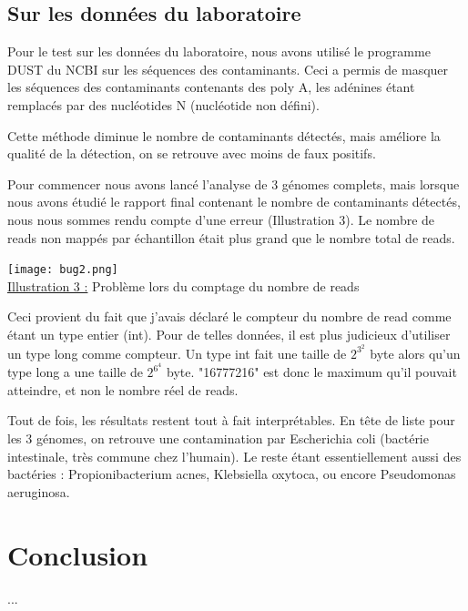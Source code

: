 \documentclass[a4paper,12pt]{article}
\begin{document}
\subsection{Sur les données du laboratoire}

Pour le test sur les données du laboratoire, nous avons utilisé le programme DUST du NCBI sur les séquences des contaminants. Ceci a permis de masquer les séquences des contaminants contenants des poly A, les adénines étant remplacés par des nucléotides N (nucléotide non défini).

Cette méthode diminue le nombre de contaminants détectés, mais améliore la qualité de la détection, on se retrouve avec moins de faux positifs. 

Pour commencer nous avons lancé l'analyse de 3 génomes complets, mais lorsque nous avons étudié le rapport final contenant le nombre de contaminants détectés, nous nous sommes rendu compte d'une erreur (Illustration 3). Le nombre de reads non mappés par échantillon était plus grand que le nombre total de reads. 
\begin{center}
 \texttt{[image: bug2.png]}~\\
 \underline{Illustration 3 :} Problème lors du comptage du nombre de reads
 \end{center}
Ceci provient du fait que j'avais déclaré le compteur du nombre de read comme étant un type entier (int). Pour de telles données, il est plus judicieux d'utiliser un type long comme compteur. Un type int fait une taille de $2^3^2$ byte alors qu'un type long a une taille de $2^6^4$ byte. "16777216" est donc le maximum qu'il pouvait atteindre, et non le nombre réel de reads.

Tout de fois, les résultats restent tout à fait interprétables. En tête de liste pour les 3 génomes, on retrouve une contamination par Escherichia coli (bactérie intestinale, très commune chez l'humain). Le reste étant essentiellement aussi des bactéries : Propionibacterium acnes, Klebsiella oxytoca, ou encore Pseudomonas aeruginosa. 

\clearpage
\section{Conclusion}
...\\
 
\clearpage


\end{document}
